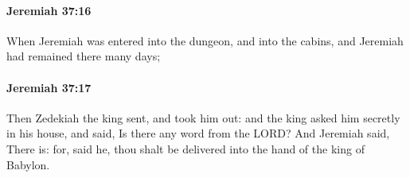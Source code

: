 		\paragraph{Jeremiah 37:16} %
			\label{JEREMIAH-37-16}

			When Jeremiah was entered into the dungeon, and into the cabins, and Jeremiah had remained there many days;


		\paragraph{Jeremiah 37:17} %
			\label{JEREMIAH-37-17}

			Then Zedekiah the king sent, and took him out: and the king asked him secretly in his house, and said, Is there any word from the LORD? And Jeremiah said, There is: for, said he, thou shalt be delivered into the hand of the king of Babylon.


